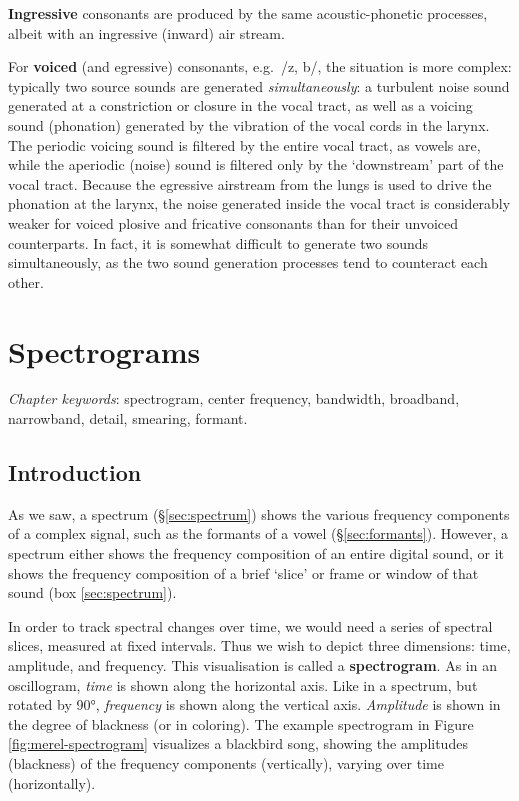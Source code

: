 \documentclass[
]{book}
\begin{document}
\textbf{Ingressive} consonants are produced by the same acoustic-phonetic processes, albeit with an ingressive (inward) air stream.

For \textbf{voiced} (and egressive) consonants, e.g.~/z, b/, the situation is more complex: typically two source sounds are generated \emph{simultaneously}: a turbulent noise sound generated at a constriction or closure in the vocal tract, as well as a voicing sound (phonation) generated by the vibration of the vocal cords in the larynx. The periodic voicing sound is filtered by the entire vocal tract, as vowels are, while the aperiodic (noise) sound is filtered only by the `downstream' part of the vocal tract.
Because the egressive airstream from the lungs is used to drive the phonation at the larynx, the noise generated inside the vocal tract is considerably weaker for voiced plosive and fricative consonants than for their unvoiced counterparts. In fact, it is somewhat difficult to generate two sounds simultaneously, as the two sound generation processes tend to counteract each other.

\chapter{Spectrograms}\label{ch-spectrograms}

\emph{Chapter keywords}: spectrogram, center frequency, bandwidth, broadband, narrowband, detail, smearing, formant.

\section{Introduction}\label{sec:spectrogram-intro}

As we saw, a spectrum (§\ref{sec:spectrum}) shows the various frequency components of a complex signal, such as the formants of a vowel (§\ref{sec:formants}). However, a spectrum either shows the frequency composition of an entire digital sound, or it shows the frequency composition of a brief `slice' or frame or window of that sound (box \ref{sec:spectrum}).

In order to track spectral changes over time, we would need a series of spectral slices, measured at fixed intervals. Thus we wish to depict three dimensions: time, amplitude, and frequency. This visualisation is called a \textbf{spectrogram}. As in an oscillogram, \emph{time} is shown along the horizontal axis. Like in a spectrum, but rotated by 90°, \emph{frequency} is shown along the vertical axis. \emph{Amplitude} is shown in the degree of blackness (or in coloring).
The example spectrogram in Figure \ref{fig:merel-spectrogram} visualizes a blackbird song, showing the amplitudes (blackness) of the frequency components (vertically), varying over time (horizontally).
\end{document}
